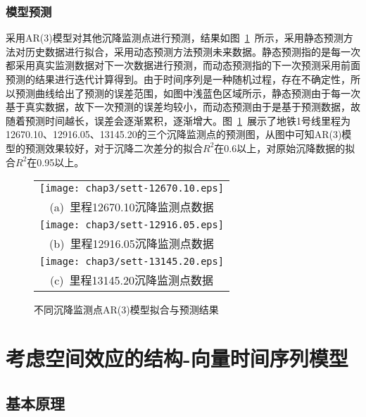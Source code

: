\subsubsection{模型预测}

采用AR(3)模型对其他沉降监测点进行预测，结果如图~\ref{fig:不同沉降监测点AR3模型拟合与预测结果}~所示，采用静态预测方法对历史数据进行拟合，采用动态预测方法预测未来数据。静态预测指的是每一次都采用真实监测数据对下一次数据进行预测，而动态预测指的下一次预测采用前面预测的结果进行迭代计算得到。由于时间序列是一种随机过程，存在不确定性，所以预测曲线给出了预测的误差范围，如图中浅蓝色区域所示，静态预测由于每一次基于真实数据，故下一次预测的误差均较小，而动态预测由于是基于预测数据，故随着预测时间越长，误差会逐渐累积，逐渐增大。图~\ref{fig:不同沉降监测点AR3模型拟合与预测结果}~展示了地铁1号线里程为 12670.10、12916.05、13145.20的三个沉降监测点的预测图，从图中可知AR(3)模型的预测效果较好，对于沉降二次差分的拟合$R^2$在0.6以上，对原始沉降数据的拟合$R^2$在0.95以上。

\begin{figure}[htbp] 
    \centering 
    \begin{tabular}{c} 
        \texttt{[image: chap3/sett-12670.10.eps]} \\ 
        (a)~里程12670.10沉降监测点数据 \\
        \texttt{[image: chap3/sett-12916.05.eps]} \\ 
        (b)~里程12916.05沉降监测点数据 \\
        \texttt{[image: chap3/sett-13145.20.eps]} \\ 
        (c)~里程13145.20沉降监测点数据 \\
    \end{tabular}
    \caption{不同沉降监测点AR(3)模型拟合与预测结果} 
    \label{fig:不同沉降监测点AR3模型拟合与预测结果} 
\end{figure}

\section{考虑空间效应的结构-向量时间序列模型}

\subsection{基本原理}

